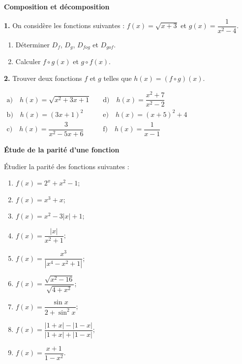 \documentclass{article}
\begin{document}
 \quad \textbf{Composition et décomposition}

\bigskip

\noindent
\textbf{1.} On considère les fonctions suivantes :  
\( f(x) = \sqrt{x + 3} \) et \( g(x) = \dfrac{1}{x^2 - 4} \).

\begin{enumerate}
    \item Déterminer \( D_f \), \( D_g \), \( D_{fog} \) et \( D_{gof} \).
    \item Calculer \( f \circ g(x) \) et \( g \circ f(x) \).
\end{enumerate}

\bigskip

\noindent
\textbf{2.} Trouver deux fonctions \( f \) et \( g \) telles que  
\( h(x) = (f \circ g)(x) \).

\bigskip

\noindent
\(
\begin{array}{ll}
    \text{a)} \quad h(x) = \sqrt{x^2 + 3x + 1} & \quad
    \text{d)} \quad h(x) = \dfrac{x^2 + 7}{x^2 - 2} \\
    \text{b)} \quad h(x) = (3x + 1)^2 & \quad
    \text{e)} \quad h(x) = (x + 5)^2 + 4 \\
    \text{c)} \quad h(x) = \dfrac{3}{x^2 - 5x + 6} & \quad
    \text{f)} \quad h(x) = \dfrac{1}{x - 1}
\end{array}
\)

 \quad \textbf{Étude de la parité d’une fonction}

\bigskip

Étudier la parité des fonctions suivantes :

\begin{enumerate}
    \item \( f(x) = 2^x + x^2 - 1 \);
    \item \( f(x) = x^3 + x \);
    \item \( f(x) = x^2 - 3|x| + 1 \);
    \item \( f(x) = \dfrac{|x|}{x^2 + 1} \);
    \item \( f(x) = \dfrac{x^3}{|x^4 - x^2 + 1|} \);
    \item \( f(x) = \dfrac{\sqrt{x^2 - 16}}{\sqrt{4 + x^2}} \);
    \item \( f(x) = \dfrac{\sin x}{2 + \sin^2 x} \);
    \item \( f(x) = \dfrac{|1 + x| - |1 - x|}{|1 + x| + |1 - x|} \);
    \item \( f(x) = \dfrac{x + 1}{1 - x^2} \).
\end{enumerate}
\end{document}
